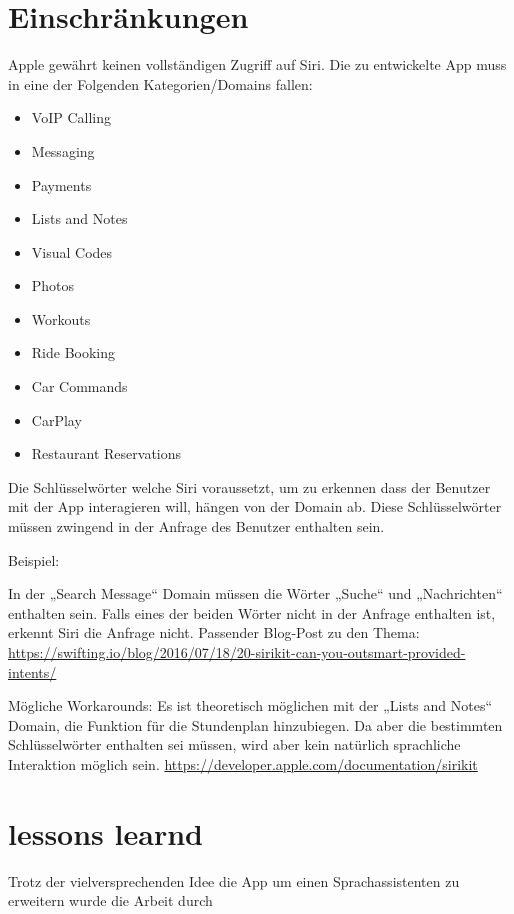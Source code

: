 \section{Einschränkungen}

Apple gewährt keinen vollständigen Zugriff auf Siri. Die zu entwickelte App muss in eine der Folgenden Kategorien/Domains fallen:
\begin{itemize}
\item VoIP Calling 
\item Messaging
\item Payments
\item Lists and Notes
\item Visual Codes
\item Photos
\item Workouts
\item Ride Booking
\item Car Commands
\item CarPlay
\item Restaurant Reservations
\end{itemize}

\newpage

Die Schlüsselwörter welche Siri voraussetzt, um zu erkennen dass der Benutzer mit der App interagieren will, hängen von der Domain ab.
Diese Schlüsselwörter müssen zwingend in der Anfrage des Benutzer enthalten sein. 

Beispiel: 

In der „Search Message“  Domain müssen die Wörter „Suche“ und „Nachrichten“ enthalten sein. Falls eines der beiden Wörter nicht in der Anfrage enthalten ist, erkennt Siri die Anfrage nicht.  \newline
Passender Blog-Post zu den Thema: \newline
\url{https://swifting.io/blog/2016/07/18/20-sirikit-can-you-outsmart-provided-intents/}

Mögliche Workarounds: \newline
Es ist theoretisch möglichen mit der „Lists and Notes“ Domain, die Funktion für die Stundenplan hinzubiegen. Da aber die bestimmten Schlüsselwörter enthalten sei müssen, wird aber kein natürlich sprachliche Interaktion möglich sein.
\url{https://developer.apple.com/documentation/sirikit}

\section{lessons learnd}
Trotz der vielversprechenden Idee die App um einen Sprachassistenten zu erweitern wurde die Arbeit durch 